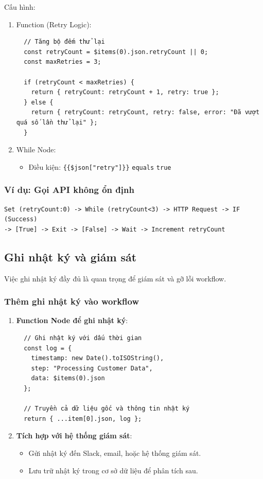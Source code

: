 Cấu hình:
\begin{enumerate}
  \item Function (Retry Logic):
  \begin{verbatim}
  // Tăng bộ đếm thử lại
  const retryCount = $items(0).json.retryCount || 0;
  const maxRetries = 3;
  
  if (retryCount < maxRetries) {
    return { retryCount: retryCount + 1, retry: true };
  } else {
    return { retryCount: retryCount, retry: false, error: "Đã vượt quá số lần thử lại" };
  }
  \end{verbatim}

  \item While Node:
  \begin{itemize}
    \item Điều kiện: \texttt{\{\{\$json["retry"]\}\}} \texttt{equals} \texttt{true}
  \end{itemize}
\end{enumerate}

\subsubsection{Ví dụ: Gọi API không ổn định}

\begin{verbatim}
Set (retryCount:0) -> While (retryCount<3) -> HTTP Request -> IF (Success)
-> [True] -> Exit -> [False] -> Wait -> Increment retryCount
\end{verbatim}
\subsection{Ghi nhật ký và giám sát}

Việc ghi nhật ký đầy đủ là quan trọng để giám sát và gỡ lỗi workflow.

\subsubsection{Thêm ghi nhật ký vào workflow}

\begin{enumerate}
  \item \textbf{Function Node để ghi nhật ký}:
  \begin{verbatim}
  // Ghi nhật ký với dấu thời gian
  const log = {
    timestamp: new Date().toISOString(),
    step: "Processing Customer Data",
    data: $items(0).json
  };
  
  // Truyền cả dữ liệu gốc và thông tin nhật ký
  return { ...item[0].json, log };
  \end{verbatim}

  \item \textbf{Tích hợp với hệ thống giám sát}:
  \begin{itemize}
    \item Gửi nhật ký đến Slack, email, hoặc hệ thống giám sát.
    \item Lưu trữ nhật ký trong cơ sở dữ liệu để phân tích sau.
  \end{itemize}
\end{enumerate}

